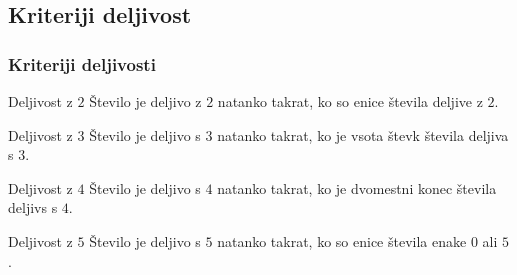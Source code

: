 



    \subsection{Kriteriji deljivost}

        \begin{frame}
            \frametitle{Kriteriji deljivosti}

            \begin{alertblock}{Deljivost z $2$}
                Število je deljivo z $2$ natanko takrat, ko so enice števila deljive z $2$.
            \end{alertblock}

            \begin{alertblock}{Deljivost z $3$}
                Število je deljivo s $3$ natanko takrat, ko je vsota števk števila deljiva s $3$.
            \end{alertblock}

            \begin{alertblock}{Deljivost z $4$}
                Število je deljivo s $4$ natanko takrat, ko je dvomestni konec števila deljivs s $4$.
            \end{alertblock}

            \begin{alertblock}{Deljivost z $5$}
                Število je deljivo s $5$ natanko takrat, ko so enice števila enake $0$ ali $5$.
            \end{alertblock}

        \end{frame}

